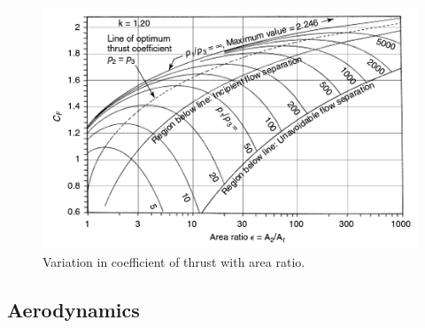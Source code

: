 		
		
		
		\begin{figure}[ht]
			\centering
			\includegraphics[width=0.7\linewidth]{"figures/3_vehicle_design/Thrust Coefficient - Arat"}
			\caption{Variation in coefficient of thrust with area ratio\cite{RPE}.}
			\label{fig:ThrustCoefficient-Arat}
		\end{figure}

		\subsection{Aerodynamics}\label{sec:thirdstageaero}
		
